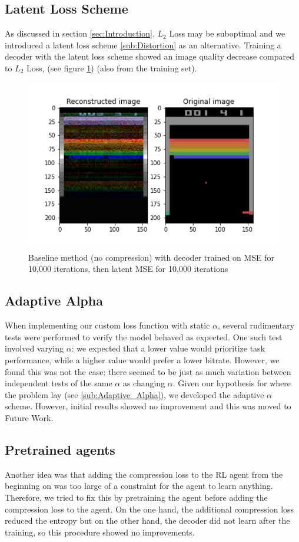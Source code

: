 \subsection{Latent Loss Scheme}
As discussed in section \ref{sec:Introduction}, $L_2$ Loss may be suboptimal and
we introduced a latent loss scheme \ref{sub:Distortion} as an alternative.
Training a decoder with the latent loss scheme showed an image quality decrease compared to $L_2$ Loss, (see figure \ref{fig:baseline_MSE_latent}) (also from the training set).

\begin{figure}[H]
    \centering
    \includegraphics[width=\linewidth]{images/orig_reconstructed_rl3.0.png}
    \caption{Baseline method (no compression) with decoder trained on MSE for 10,000 iterations, then latent MSE for 10,000 iterations}
    \label{fig:baseline_MSE_latent}
\end{figure}

\subsection{Adaptive Alpha}
When implementing our custom loss function with static $\alpha$, several
rudimentary tests were performed to verify the model behaved as expected. One
such test involved varying $\alpha$: we expected that a lower value would
prioritize task performance, while a higher value would prefer a lower bitrate.
However, we found this was not the case: there seemed to be just as much
variation between independent tests of the same $\alpha$ as changing $\alpha$.
Given our hypothesis for where the problem lay (see \ref{sub:Adaptive_Alpha}),
we developed the adaptive $\alpha$ scheme. However, initial results showed no
improvement and this was moved to Future Work.

\subsection{Pretrained agents}
Another idea was that adding the compression loss to the RL agent from the
beginning on was too large of a constraint for the agent to learn anything.
Therefore, we tried to fix this by pretraining the agent before adding
the compression loss to the agent. On the one hand, the additional compression
loss reduced the entropy but on the other hand, the decoder did not learn
after the training, so this procedure showed no improvements.


